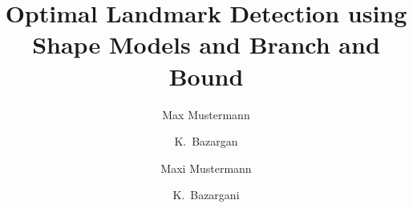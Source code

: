 \documentclass[portrait,final,a0paper,fontscale=0.277]{NTFDposter}
\begin{document}
	\author[iec]{Max Mustermann}
    
    \author[vtc]{K.~Bazargan}
     
     \author{Maxi Mustermann}
    
    \author{K.~Bazargani}
   
   \address[iec]{River Valley Technologies, SJP Building, Cotton Hills, Trivandrum, Kerala, India 695014}
   \address[vtc]{Institut f\"ur Energieverfahrenstechnik und Chemieingenieurwesn, Fuchsm\"uhlenweg 9, 09599 Freiberg}
   
   
   \title{Optimal Landmark Detection using Shape Models and Branch and Bound }

\end{document}
